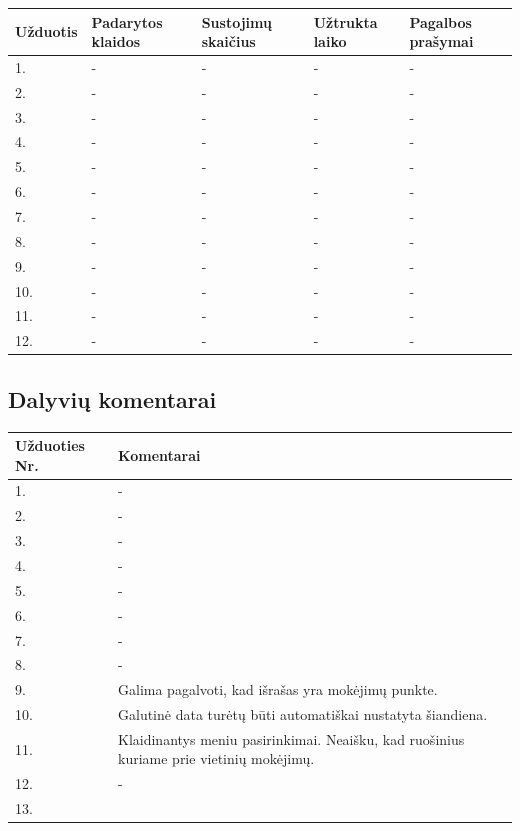 \documentclass[oneside]{VUMIFPSkursinis}
\begin{document}
\begin{center}
\begin{table}[!pht]
	\begin{tabular}{ |p{1.8cm} | p{3.4cm} | p{3.4cm} | p{2.5cm} | p{3.5cm}|}
	\hline
	Užduotis&Padarytos klaidos&Sustojimų skaičius&Užtrukta laiko&Pagalbos prašymai\\ \hline
1.&-&-&-&- \\ \hline
2.&-&-&-&- \\ \hline
3.&-&-&-&- \\ \hline
4.&-&-&-&- \\ \hline
5.&-&-&-&- \\ \hline
6.&-&-&-&- \\ \hline
7.&-&-&-&- \\ \hline
8.&-&-&-&- \\ \hline
9.&-&-&-&- \\ \hline
10.&-&-&-&- \\ \hline
11.&-&-&-&- \\ \hline
12.&-&-&-&- \\ \hline
\end{tabular}
\end{table}
\vspace{0.7cm}
\end{center}
\subsection{Dalyvių komentarai}
\begin{center}
	\begin{tabular}{ |p{3cm}| p{12cm} |}
	\hline
Užduoties Nr.&Komentarai\\ \hline
1. & - \\ \hline
2. & - \\ \hline
3. & - \\ \hline
4. & - \\ \hline
5. & - \\ \hline
6. & - \\ \hline
7. & - \\ \hline
8. & - \\ \hline
9. & Galima pagalvoti, kad išrašas yra mokėjimų punkte. \\ \hline
10. & Galutinė data turėtų būti automatiškai nustatyta šiandiena. \\ \hline
11. & Klaidinantys meniu pasirinkimai. Neaišku, kad ruošinius kuriame prie vietinių mokėjimų. \\ \hline
12. & - \\ \hline
13. &  \\ \hline
	\end{tabular}
\end{center}
\end{document}
